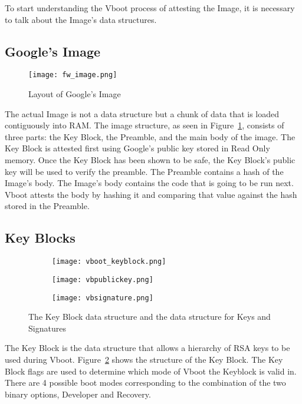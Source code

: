 To start understanding the Vboot process of attesting the Image, it is necessary
to talk about the Image's data structures.

\subsection{Google's Image}

\begin{figure}
    \centering
    \texttt{[image: fw\_image.png]}
    \caption[Google's Image Data Layout]{Layout of Google's Image~\cite{vboot-data-structures}}
    \label{fig:vboot_images}
\end{figure}

The actual Image is not a data structure but a chunk of data that is loaded
contiguously into RAM\@.
The image structure, as seen in Figure~\ref{fig:vboot_images}, consists of three
parts: the Key Block, the Preamble, and the main body of the image.
The Key Block is attested first using Google's public key stored in Read Only memory.
Once the Key Block has been shown to be safe, the Key Block's public key will be used to verify the preamble.
The Preamble contains a hash of the Image's body.
The Image's body contains the code that is going to be run next.
Vboot attests the body by hashing it and comparing that value against the hash
stored in the Preamble.

\subsection{Key Blocks}\label{sec:key_block}

\begin{figure}
\begin{subfigure}{.5\textwidth}
  \centering
  \texttt{[image: vboot\_keyblock.png]}
\end{subfigure}
\begin{subfigure}{.20\textwidth}
  \centering
  \texttt{[image: vbpublickey.png]}
\end{subfigure}
\begin{subfigure}{.20\textwidth}
  \centering
  \texttt{[image: vbsignature.png]}
\end{subfigure}
\caption[Key Block Data Structure]{The Key Block data structure and the data
structure for Keys and Signatures}
\label{fig:vboot_keyblock}
\end{figure}

The Key Block is the data structure that allows a hierarchy of RSA keys to be used during Vboot.
Figure~\ref{fig:vboot_keyblock} shows the structure of the Key Block. 
The Key Block flags are used to determine which mode of Vboot the Keyblock is valid in. 
There are 4 possible boot modes corresponding to the combination of the two binary options, Developer and Recovery.


